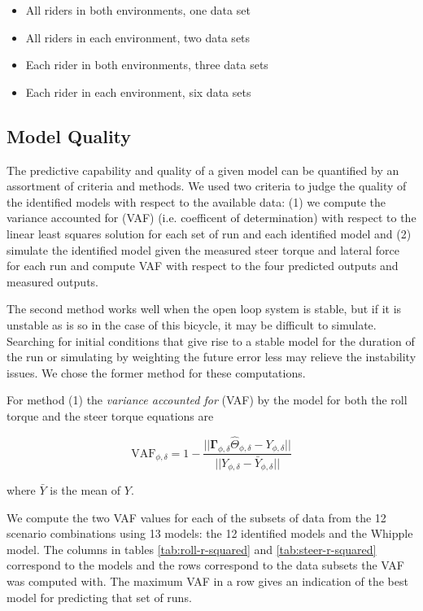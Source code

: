 \documentclass[a4paper]{article}
\begin{document}
\begin{itemize}
  \item
    All riders in both environments, one data set
  \item
    All riders in each environment, two data sets
  \item
    Each rider in both environments, three data sets
  \item
    Each rider in each environment, six data sets
\end{itemize}

\subsection{Model Quality}

The predictive capability and quality of a given model can be quantified by an
assortment of criteria and methods. We used two criteria to judge the quality
of the identified models with respect to the available data: (1) we compute the
variance accounted for (VAF) (i.e. coefficent of determination) with respect to
the linear least squares solution for each set of run and each identified model
and (2) simulate the identified model given the measured steer torque and
lateral force for each run and compute VAF with respect to the four predicted
outputs and measured outputs.

The second method works well when the open loop system is stable, but if it is
unstable as is so in the case of this bicycle, it may be difficult to simulate.
Searching for initial conditions that give rise to a stable model for the
duration of the run or simulating by weighting the future error less may
relieve the instability issues. We chose the former method for these
computations.

For method (1) the \emph{variance accounted for} (VAF) by the model for both
the roll torque and the steer torque equations are

\begin{equation}
  \label{eq:vaf}
  \textrm{VAF}_{\phi,\delta} = 1 - \frac{\vert \vert
    \mathbf{\Gamma}_{\phi,\delta}\hat{\Theta}_{\phi,\delta} - Y_{\phi,\delta} \vert \vert}
                            {\vert \vert Y_{\phi,\delta} - \bar{Y}_{\phi,\delta} \vert \vert}
\end{equation}

where $\bar{Y}$ is the mean of $Y$.

We compute the two VAF values for each of the subsets of data from the 12
scenario combinations using 13 models: the 12 identified models and the Whipple
model. The columns in tables \ref{tab:roll-r-squared} and
\ref{tab:steer-r-squared} correspond to the models and the rows correspond to
the data subsets the VAF was computed with. The maximum VAF in a row gives an
indication of the best model for predicting that set of runs.
\end{document}
